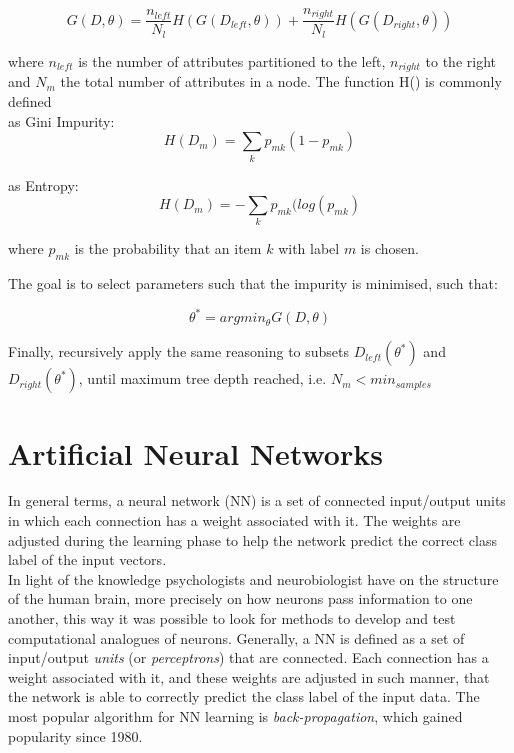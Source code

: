 \begin{equation}
	G(D,\theta) = \frac{n_{left}}{N_l}H(G(D_{left},\theta)) + \frac{n_{right}}{N_l}H(G(D_{right},\theta)) 
\end{equation}

where $n_{left}$ is the number of attributes partitioned to the left, $n_{right}$ to the right and $N_m$ the total number of attributes in a node. The function H() is commonly defined \\

as Gini Impurity: 
\begin{equation}
	H(D_m) = \sum_k p_{mk}(1-p_{mk})
\end{equation}

as Entropy:
\begin{equation}
	H(D_m) = -\sum_k p_{mk}(log(p_{mk})
\end{equation}

where $p_{mk}$ is the probability that an item $k$ with label $m$ is chosen.

The goal is to select parameters such that the impurity is minimised, such that:

\begin{equation}
	\theta^* = argmin_{\theta}  G(D, \theta)
\end{equation} 

Finally, recursively apply the same reasoning to subsets $D_{left}(\theta^*)$ and $D_{right}(\theta^*)$, until maximum tree depth reached, i.e. $N_m < min_{samples}$ \cite{DTform}


\section{Artificial Neural Networks}

In general terms, a neural network (NN) is a set of connected input/output units in which each connection has a weight associated with it. The weights are adjusted during the learning phase to help the network predict the correct class label of the input vectors.
\\

In light of the knowledge psychologists and neurobiologist have on the structure of the human brain, more precisely on how neurons pass information to one another, this way it was possible to look for methods to develop and test computational analogues of neurons. Generally, a NN is defined as a set of input/output \textit{units} (or \textit{perceptrons}) that are connected. Each connection has a weight associated with it, and these weights are adjusted in such manner, that the network is able to correctly predict the class label of the input data. The most popular algorithm for NN learning is \textit{back-propagation}, which gained popularity since 1980. \cite{HanDataMining}
\\

